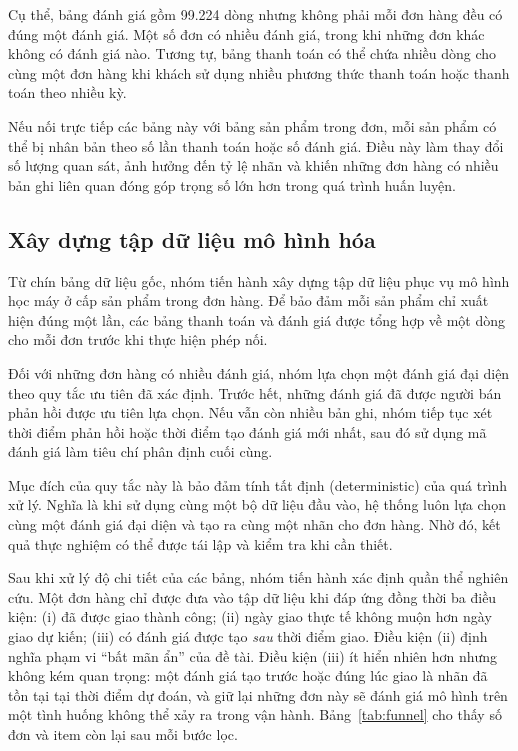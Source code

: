 \documentclass[12pt,a4paper]{report}
\begin{document}
Cụ thể, bảng đánh giá gồm 99.224 dòng nhưng không phải mỗi đơn hàng đều có đúng một đánh giá. Một số đơn có nhiều đánh giá, trong khi những đơn khác không có đánh giá nào. Tương tự, bảng thanh toán có thể chứa nhiều dòng cho cùng một đơn hàng khi khách sử dụng nhiều phương thức thanh toán hoặc thanh toán theo nhiều kỳ.

Nếu nối trực tiếp các bảng này với bảng sản phẩm trong đơn, mỗi sản phẩm có thể bị nhân bản theo số lần thanh toán hoặc số đánh giá. Điều này làm thay đổi số lượng quan sát, ảnh hưởng đến tỷ lệ nhãn và khiến những đơn hàng có nhiều bản ghi liên quan đóng góp trọng số lớn hơn trong quá trình huấn luyện.

\subsection{Xây dựng tập dữ liệu mô hình hóa}

Từ chín bảng dữ liệu gốc, nhóm tiến hành xây dựng tập dữ liệu phục vụ mô hình học máy ở cấp sản phẩm trong đơn hàng. Để bảo đảm mỗi sản phẩm chỉ xuất hiện đúng một lần, các bảng thanh toán và đánh giá được tổng hợp về một dòng cho mỗi đơn trước khi thực hiện phép nối.

Đối với những đơn hàng có nhiều đánh giá, nhóm lựa chọn một đánh giá đại diện theo quy tắc ưu tiên đã xác định. Trước hết, những đánh giá đã được người bán phản hồi được ưu tiên lựa chọn. Nếu vẫn còn nhiều bản ghi, nhóm tiếp tục xét thời điểm phản hồi hoặc thời điểm tạo đánh giá mới nhất, sau đó sử dụng mã đánh giá làm tiêu chí phân định cuối cùng.

Mục đích của quy tắc này là bảo đảm tính tất định (deterministic) của quá trình xử lý. Nghĩa là khi sử dụng cùng một bộ dữ liệu đầu vào, hệ thống luôn lựa chọn cùng một đánh giá đại diện và tạo ra cùng một nhãn cho đơn hàng. Nhờ đó, kết quả thực nghiệm có thể được tái lập và kiểm tra khi cần thiết.

Sau khi xử lý độ chi tiết của các bảng, nhóm tiến hành xác định quần thể nghiên cứu. Một đơn hàng chỉ được đưa vào tập dữ liệu khi đáp ứng đồng thời ba điều kiện: (i) đã được giao thành công; (ii) ngày giao thực tế không muộn hơn ngày giao dự kiến; (iii) có đánh giá được tạo \emph{sau} thời điểm giao. Điều kiện (ii) định nghĩa phạm vi ``bất mãn ẩn'' của đề tài. Điều kiện (iii) ít hiển nhiên hơn nhưng không kém quan trọng: một đánh giá tạo trước hoặc đúng lúc giao là nhãn đã tồn tại tại thời điểm dự đoán, và giữ lại những đơn này sẽ đánh giá mô hình trên một tình huống không thể xảy ra trong vận hành. Bảng~\ref{tab:funnel} cho thấy số đơn và item còn lại sau mỗi bước lọc.
\end{document}
